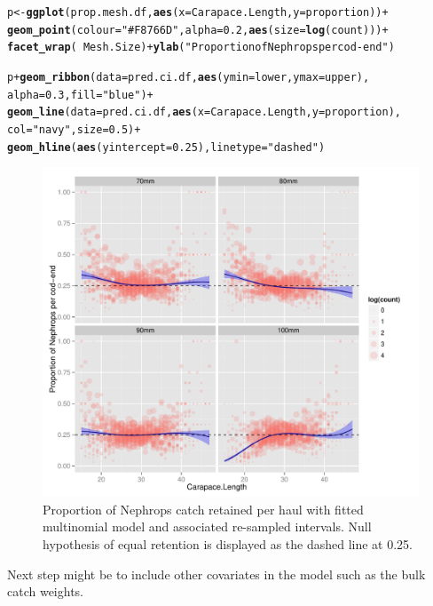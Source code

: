 \documentclass[12pt]{article}\usepackage[]{graphicx}\usepackage[]{color}
\makeatletter
\def\maxwidth{ %
  \ifdim\Gin@nat@width>\linewidth
    \linewidth
  \else
    \Gin@nat@width
  \fi
}
\newcommand{\hlnum}[1]{\textcolor[rgb]{0.686,0.059,0.569}{#1}}%
\newcommand{\hlstr}[1]{\textcolor[rgb]{0.192,0.494,0.8}{#1}}%
\newcommand{\hlopt}[1]{\textcolor[rgb]{0,0,0}{#1}}%
\newcommand{\hlstd}[1]{\textcolor[rgb]{0.345,0.345,0.345}{#1}}%
\newcommand{\hlkwb}[1]{\textcolor[rgb]{0.69,0.353,0.396}{#1}}%
\newcommand{\hlkwc}[1]{\textcolor[rgb]{0.333,0.667,0.333}{#1}}%
\newcommand{\hlkwd}[1]{\textcolor[rgb]{0.737,0.353,0.396}{\textbf{#1}}}%
\newenvironment{kframe}{%
 \def\at@end@of@kframe{}%
 \ifinner\ifhmode%
  \def\at@end@of@kframe{\end{minipage}}%
  \begin{minipage}{\columnwidth}%
 \fi\fi%
 \def\FrameCommand##1{\hskip\@totalleftmargin \hskip-\fboxsep
 \colorbox{shadecolor}{##1}\hskip-\fboxsep
     \hskip-\linewidth \hskip-\@totalleftmargin \hskip\columnwidth}%
 \MakeFramed {\advance\hsize-\width
   \@totalleftmargin\z@ \linewidth\hsize
   \@setminipage}}%
 {\par\unskip\endMakeFramed%
 \at@end@of@kframe}
\newenvironment{knitrout}{}{} %
\makeatother
\begin{document}
\begin{knitrout}\footnotesize
{}\color{fgcolor}\begin{kframe}
\begin{alltt}
\hlstd{p} \hlkwb{<-} \hlkwd{ggplot}\hlstd{(prop.mesh.df,} \hlkwd{aes}\hlstd{(}\hlkwc{x} \hlstd{= Carapace.Length,} \hlkwc{y} \hlstd{= proportion))} \hlopt{+}
  \hlkwd{geom_point}\hlstd{(}\hlkwc{colour} \hlstd{=} \hlstr{"#F8766D"}\hlstd{,} \hlkwc{alpha} \hlstd{=} \hlnum{0.2}\hlstd{,} \hlkwd{aes}\hlstd{(}\hlkwc{size} \hlstd{=} \hlkwd{log}\hlstd{(count)))} \hlopt{+}
\hlkwd{facet_wrap}\hlstd{(}\hlopt{~} \hlstd{Mesh.Size)} \hlopt{+} \hlkwd{ylab}\hlstd{(}\hlstr{"Proportion of Nephrops per cod-end"}\hlstd{)}

\hlstd{p} \hlopt{+} \hlkwd{geom_ribbon}\hlstd{(}\hlkwc{data}\hlstd{=pred.ci.df,} \hlkwd{aes}\hlstd{(}\hlkwc{ymin} \hlstd{= lower,} \hlkwc{ymax} \hlstd{= upper),}
                \hlkwc{alpha}\hlstd{=}\hlnum{0.3}\hlstd{,} \hlkwc{fill} \hlstd{=} \hlstr{"blue"}\hlstd{)} \hlopt{+}
  \hlkwd{geom_line}\hlstd{(}\hlkwc{data} \hlstd{= pred.ci.df,} \hlkwd{aes}\hlstd{(}\hlkwc{x} \hlstd{= Carapace.Length,} \hlkwc{y} \hlstd{= proportion),}
            \hlkwc{col} \hlstd{=} \hlstr{"navy"}\hlstd{,} \hlkwc{size} \hlstd{=} \hlnum{0.5}\hlstd{)} \hlopt{+}
  \hlkwd{geom_hline}\hlstd{(}\hlkwd{aes}\hlstd{(}\hlkwc{yintercept} \hlstd{=} \hlnum{0.25}\hlstd{),} \hlkwc{linetype} \hlstd{=} \hlstr{"dashed"}\hlstd{)}
\end{alltt}
\end{kframe}\begin{figure}
\includegraphics[width=\maxwidth]{figure/unnamed-chunk-7-1} \caption[Proportion of Nephrops catch retained per haul with fitted multinomial model and associated re-sampled intervals]{Proportion of Nephrops catch retained per haul with fitted multinomial model and associated re-sampled intervals. Null hypothesis of equal retention is displayed as the dashed line at 0.25.}\label{fig:unnamed-chunk-7}
\end{figure}


\end{knitrout}
Next step might be to include other covariates in the model such as the bulk catch weights.



\end{document}

